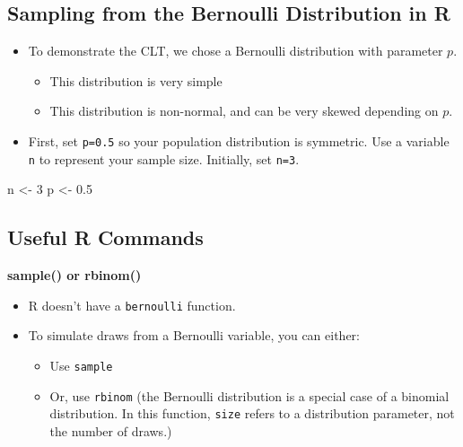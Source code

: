 \documentclass[
]{book}
\newenvironment{Shaded}{\begin{snugshade}}{\end{snugshade}}
\newcommand{\DecValTok}[1]{\textcolor[rgb]{0.00,0.00,0.81}{#1}}
\newcommand{\FloatTok}[1]{\textcolor[rgb]{0.00,0.00,0.81}{#1}}
\newcommand{\NormalTok}[1]{#1}
\newcommand{\OtherTok}[1]{\textcolor[rgb]{0.56,0.35,0.01}{#1}}
\providecommand{\tightlist}{%
  \setlength{\itemsep}{0pt}\setlength{\parskip}{0pt}}
\theoremstyle{definition}
\theoremstyle{definition}
\theoremstyle{definition}
\theoremstyle{definition}
\theoremstyle{remark}
\begin{document}
\hypertarget{sampling-from-the-bernoulli-distribution-in-r}{%
\subsection{Sampling from the Bernoulli Distribution in R}\label{sampling-from-the-bernoulli-distribution-in-r}}

\begin{itemize}
\tightlist
\item
  To demonstrate the CLT, we chose a Bernoulli distribution with parameter \(p\).

  \begin{itemize}
  \tightlist
  \item
    This distribution is very simple
  \item
    This distribution is non-normal, and can be very skewed depending on \(p\).
  \end{itemize}
\item
  First, set \texttt{p=0.5} so your population distribution is symmetric. Use a variable \texttt{n} to represent your sample size. Initially, set \texttt{n=3}.
\end{itemize}

\begin{Shaded}
\begin{Highlighting}[]
\NormalTok{n }\OtherTok{\textless{}{-}} \DecValTok{3}
\NormalTok{p }\OtherTok{\textless{}{-}} \FloatTok{0.5}
\end{Highlighting}
\end{Shaded}

\hypertarget{useful-r-commands}{%
\subsection{Useful R Commands}\label{useful-r-commands}}

\textbf{sample() or rbinom()}

\begin{itemize}
\tightlist
\item
  R doesn't have a \texttt{bernoulli} function.
\item
  To simulate draws from a Bernoulli variable, you can either:

  \begin{itemize}
  \tightlist
  \item
    Use \texttt{sample}
  \item
    Or, use \texttt{rbinom} (the Bernoulli distribution is a special case of a binomial distribution. In this function, \texttt{size} refers to a distribution parameter, not the number of draws.)
  \end{itemize}
\end{itemize}
\end{document}
